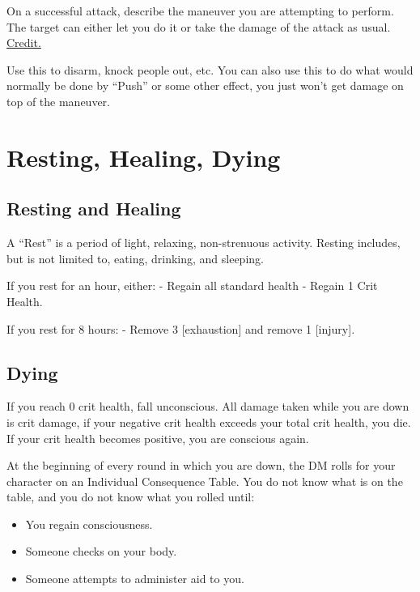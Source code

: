 \documentclass[
  letterpaper,
  DIV=11,
  numbers=noendperiod]{scrartcl}
\providecommand{\tightlist}{%
  \setlength{\itemsep}{0pt}\setlength{\parskip}{0pt}}\usepackage{longtable,booktabs,array}
\begin{document}
On a successful attack, describe the maneuver you are attempting to
perform. The target can either let you do it or take the damage of the
attack as usual.
\href{https://oddskullblog.wordpress.com/2021/11/15/combat-maneuvers-the-easy-way/}{Credit.}

Use this to disarm, knock people out, etc. You can also use this to do
what would normally be done by ``Push'' or some other effect, you just
won't get damage on top of the maneuver.

\section{Resting, Healing, Dying}\label{resting-healing-dying}

\subsection{Resting and Healing}\label{resting-and-healing}

A ``Rest'' is a period of light, relaxing, non-strenuous activity.
Resting includes, but is not limited to, eating, drinking, and sleeping.

If you rest for an hour, either: - Regain all standard health - Regain 1
Crit Health.

If you rest for 8 hours: - Remove 3 {[}exhaustion{]} and remove 1
{[}injury{]}.

\subsection{Dying}\label{dying}

If you reach 0 crit health, fall unconscious. All damage taken while you
are down is crit damage, if your negative crit health exceeds your total
crit health, you die. If your crit health becomes positive, you are
conscious again.

At the beginning of every round in which you are down, the DM rolls for
your character on an Individual Consequence Table. You do not know what
is on the table, and you do not know what you rolled until:

\begin{itemize}
\tightlist
\item
  You regain consciousness.
\item
  Someone checks on your body.
\item
  Someone attempts to administer aid to you.
\end{itemize}
\end{document}
